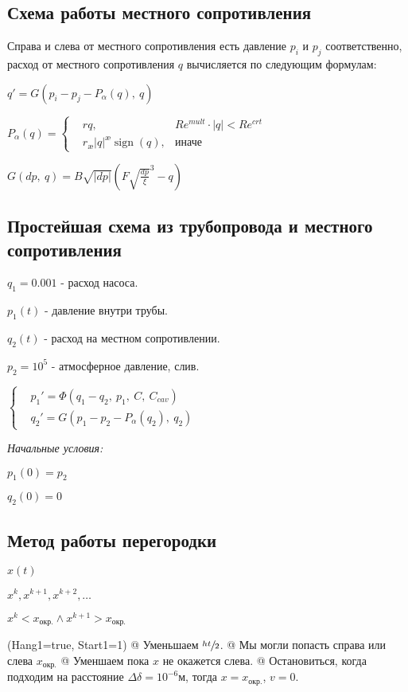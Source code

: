 \documentclass[12pt, a4paper]{article}
\DeclareMathOperator{\sign}{sign}
\begin{document}
\subsection{Схема работы местного сопротивления}

Справа и слева от местного сопротивления есть давление $p_i$ и $p_j$ соответственно, расход от местного сопротивления $q$ вычисляется по следующим формулам:

$ q' = G(p_i-p_j-P_\alpha(q),\ q) $

$
P_\alpha(q) = \left\{
\begin{aligned}
&rq,  &Re^{mult} \cdot |q| < Re^{crt} \\
&r_\text{\ae}|q|^\text{\ae}\sign(q), & \text{иначе}
\end{aligned}
\right.
$

$ G(dp,\ q) = B\sqrt{|dp|}\left(F\sqrt{\frac{dp}{\xi}}^3 - q\right) $

\subsection{Простейшая схема из трубопровода и местного сопротивления}

$ q_1 = 0.001 $ - расход насоса.

$ p_1(t) $ - давление внутри трубы.

$ q_2(t) $ - расход на местном сопротивлении.

$ p_2 = 10^5 $ - атмосферное давление, слив.

$ \left\{\begin{aligned}
& p_1' = \Phi(q_1 - q_2,\ p_1,\ C,\ C_{cav}) \\
& q_2' = G(p_1-p_2-P_\alpha(q_2),\ q_2)
\end{aligned}\right. $

\textit{Начальные условия:}

$ p_1(0) = p_2 $

$ q_2(0) = 0 $

\subsection{Метод работы перегородки}

$ x(t) $

$ x^k, x^{k+1}, x^{k+2}, \dots $

$ x^k < x_\text{окр.} \wedge x^{k+1} > x_\text{окр.} $

\noindent\begin{easylist}
\ListProperties(Hang1=true, Start1=1)
@ Уменьшаем $\sfrac{ht}{2}$.
@ Мы могли попасть справа или слева $x_\text{окр.}$
@ Уменшаем пока $x$ не окажется слева.
@ Остановиться, когда подходим на расстояние $\Delta\delta = 10^{-6} \text{м}$, тогда $x = x_{\text{окр.}}$, $v = 0$.
\end{easylist}
\end{document}
